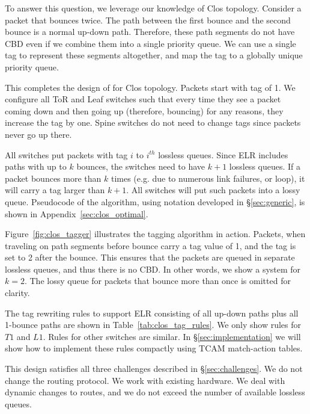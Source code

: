 To answer this question, we leverage our knowledge of Clos topology.  Consider a
packet that bounces twice. The path between the first bounce and the second
bounce is a normal up-down path. Therefore, these path segments do not have CBD
even if we combine them into a single priority queue. We can use a single tag to
represent these segments altogether, and map the tag to a globally unique
priority queue.

This completes the design of \sysname{} for Clos topology. Packets start with
tag of 1. We configure all ToR and Leaf switches such that every time they see
a packet coming down and then going up (therefore, bouncing) for any reasons,
they increase the tag by one. Spine switches do not need to change tags since 
packets never go up there.

All switches put packets with tag $i$ to $i^{th}$ lossless queues. Since ELR
includes paths with up to $k$ bounces, the switches need to have $k+1$ lossless
queues. If a packet bounces more than $k$ times (e.g. due to numerous link
failures, or loop), it will carry a tag larger than $k+1$. All switches will put
such packets into a lossy queue.  Pseudocode of the algorithm, using notation
developed in \S\ref{sec:generic}, is shown in Appendix~\ref{sec:clos_optimal}.

Figure~\ref{fig:clos_tagger} illustrates the tagging algorithm in action.
Packets, when traveling on path segments before bounce carry a tag value of 1,
and the tag is set to 2 after the bounce. This ensures that the packets are
queued in separate lossless queues, and thus there is no CBD. In other words, we
show a system for $k=2$. The lossy queue for packets that bounce more than once
is omitted for clarity.

The tag rewriting rules to support ELR consisting of all up-down paths plus all
1-bounce paths are shown in Table~\ref{tab:clos_tag_rules}. We only show rules
for $T1$ and $L1$. Rules for other switches are similar. In
\S\ref{sec:implementation} we will show how to implement these rules compactly
using TCAM match-action tables.

This design satisfies all three challenges described in \S\ref{sec:challenges}.
We do not change the routing protocol. We work with existing hardware. We deal
with dynamic changes to routes, and we do not exceed the number of available
lossless queues.

